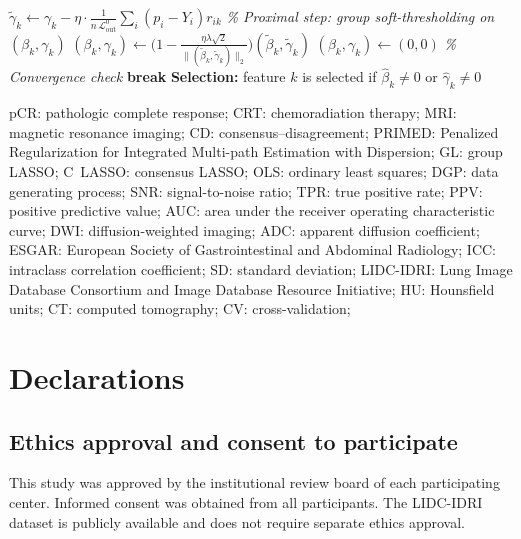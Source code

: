 \documentclass[referee,lineno,pdflatex,sn-vancouver-num]{sn-jnl}
\begin{document}
\begin{algorithm}[h]
\begin{algorithmic}[1]
    \State $\tilde\gamma_k \gets \gamma_k - \eta \cdot \tfrac{1}{n \, \mathcal{L}_{\mathrm{out}}^0} \textstyle\sum_i (p_i - Y_i) r_{ik}$
  \EndFor
  \Statex \quad \textit{\% Proximal step: group soft-thresholding on $(\beta_k, \gamma_k)$}
      \State $(\beta_k, \gamma_k) \gets \bigl(1 - \tfrac{\eta\lambda\sqrt{2}}{\|(\tilde\beta_k, \tilde\gamma_k)\|_2}\bigr)(\tilde\beta_k, \tilde\gamma_k)$
    \Else
      \State $(\beta_k, \gamma_k) \gets (0, 0)$
    \EndIf
  \EndFor
  \Statex \quad \textit{\% Convergence check}
    \State \textbf{break}
  \EndIf
\EndFor
\Statex
\State \textbf{Selection:} feature $k$ is selected if $\hat\beta_k \neq 0$ or $\hat\gamma_k \neq 0$
\end{algorithmic}
\end{algorithm}


\backmatter


\noindent
pCR: pathologic complete response;
CRT: chemoradiation therapy;
MRI: magnetic resonance imaging;
CD: consensus--disagreement;
PRIMED: Penalized Regularization for Integrated Multi-path Estimation with Dispersion;
GL: group LASSO;
C~LASSO: consensus LASSO;
OLS: ordinary least squares;
DGP: data generating process;
SNR: signal-to-noise ratio;
TPR: true positive rate;
PPV: positive predictive value;
AUC: area under the receiver operating characteristic curve;
DWI: diffusion-weighted imaging;
ADC: apparent diffusion coefficient;
ESGAR: European Society of Gastrointestinal and Abdominal Radiology;
ICC: intraclass correlation coefficient;
SD: standard deviation;
LIDC-IDRI: Lung Image Database Consortium and Image Database Resource Initiative;
HU: Hounsfield units;
CT: computed tomography;
CV: cross-validation;


\section*{Declarations}

\subsection*{Ethics approval and consent to participate}
This study was approved by the institutional review board of each participating center. Informed consent was obtained from all participants. The LIDC-IDRI dataset is publicly available and does not require separate ethics approval.
\end{document}
